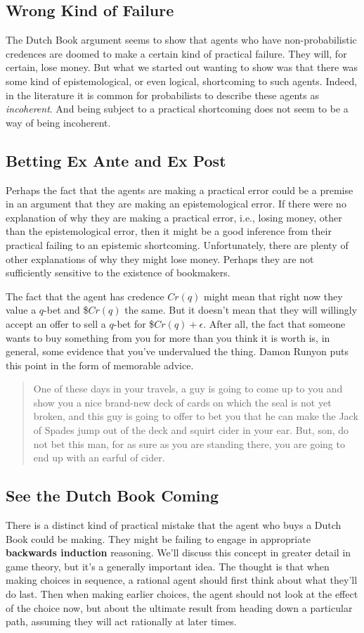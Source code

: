 \subsection{Wrong Kind of Failure}
The Dutch Book argument seems to show that agents who have non-probabilistic credences are doomed to make a certain kind of practical failure. They will, for certain, lose money. But what we started out wanting to show was that there was some kind of epistemological, or even logical, shortcoming to such agents. Indeed, in the literature it is common for probabilists to describe these agents as \textit{incoherent}. And being subject to a practical shortcoming does not seem to be a way of being incoherent.

\subsection{Betting Ex Ante and Ex Post}
Perhaps the fact that the agents are making a practical error could be a premise in an argument that they are making an epistemological error. If there were no explanation of why they are making a practical error, i.e., losing money, other than the epistemological error, then it might be a good inference from their practical failing to an epistemic shortcoming. Unfortunately, there are plenty of other explanations of why they might lose money. Perhaps they are not sufficiently sensitive to the existence of bookmakers.

The fact that the agent has credence $Cr(q)$ might mean that right now they value a $q$-bet and \$$Cr(q)$ the same. But it doesn't mean that they will willingly accept an offer to sell a $q$-bet for \$$Cr(q) + \epsilon$. After all, the fact that someone wants to buy something from you for more than you think it is worth is, in general, some evidence that you've undervalued the thing. Damon Runyon puts this point in the form of memorable advice.

\begin{quote}
One of these days in your travels, a guy is going to come up to you and show you a nice brand-new deck of cards on which the seal is not yet broken, and this guy is going to offer to bet you that he can make the Jack of Spades jump out of the deck and squirt cider in your ear. But, son, do not bet this man, for as sure as you are standing there, you are going to end up with an earful of cider.
\end{quote}

\subsection{See the Dutch Book Coming}
There is a distinct kind of practical mistake that the agent who buys a Dutch Book could be making. They might be failing to engage in appropriate \textbf{backwards induction} reasoning. We'll discuss this concept in greater detail in game theory, but it's a generally important idea. The thought is that when making choices in sequence, a rational agent should first think about what they'll do last. Then when making earlier choices, the agent should not look at the effect of the choice now, but about the ultimate result from heading down a particular path, assuming they will act rationally at later times.

